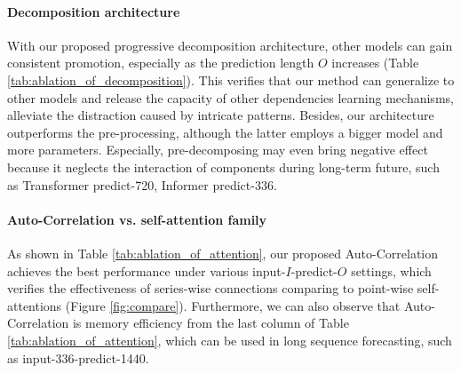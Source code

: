 \paragraph{Decomposition architecture}
With our proposed progressive decomposition architecture, other models can gain consistent promotion, especially as the prediction length $O$ increases (Table \ref{tab:ablation_of_decomposition}). This verifies that our method can generalize to other models and release the capacity of other dependencies learning mechanisms, alleviate the distraction caused by intricate patterns. Besides, our architecture outperforms the pre-processing, although the latter employs a bigger model and more parameters. Especially, pre-decomposing may even bring negative effect because it neglects the interaction of 
components during long-term future, such as Transformer \cite{NIPS2017_3f5ee243} predict-720, Informer \cite{haoyietal-informer-2021} predict-336.

\paragraph{Auto-Correlation vs. self-attention family} As shown in Table \ref{tab:ablation_of_attention}, our proposed Auto-Correlation achieves the best performance under various input-$I$-predict-$O$ settings, which verifies the effectiveness of series-wise connections comparing to point-wise self-attentions (Figure \ref{fig:compare}). Furthermore, we can also observe that Auto-Correlation is memory efficiency from the last column of Table \ref{tab:ablation_of_attention}, which can be used in long sequence forecasting, such as input-336-predict-1440.

